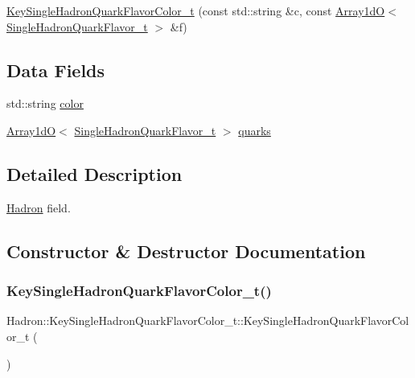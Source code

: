 \begin{DoxyCompactItemize}
\item 
\mbox{\hyperlink{structHadron_1_1KeySingleHadronQuarkFlavorColor__t_aa894166327f6565a8ec49fd863dadf47}{Key\+Single\+Hadron\+Quark\+Flavor\+Color\+\_\+t}} (const std\+::string \&c, const \mbox{\hyperlink{classADAT_1_1Array1dO}{Array1dO}}$<$ \mbox{\hyperlink{structHadron_1_1SingleHadronQuarkFlavor__t}{Single\+Hadron\+Quark\+Flavor\+\_\+t}} $>$ \&f)
\end{DoxyCompactItemize}
\subsection*{Data Fields}
\begin{DoxyCompactItemize}
\item 
std\+::string \mbox{\hyperlink{structHadron_1_1KeySingleHadronQuarkFlavorColor__t_aa5dc10dee689bef8e65d2b9230efdc85}{color}}
\item 
\mbox{\hyperlink{classADAT_1_1Array1dO}{Array1dO}}$<$ \mbox{\hyperlink{structHadron_1_1SingleHadronQuarkFlavor__t}{Single\+Hadron\+Quark\+Flavor\+\_\+t}} $>$ \mbox{\hyperlink{structHadron_1_1KeySingleHadronQuarkFlavorColor__t_ac52e7989b620c4733cc2e960394fd0fd}{quarks}}
\end{DoxyCompactItemize}


\subsection{Detailed Description}
\mbox{\hyperlink{namespaceHadron}{Hadron}} field. 

\subsection{Constructor \& Destructor Documentation}
\mbox{\label{structHadron_1_1KeySingleHadronQuarkFlavorColor__t_acd4b45c7be8c3465db55bcddff1c4617}} 
\subsubsection{\texorpdfstring{KeySingleHadronQuarkFlavorColor\_t()}{KeySingleHadronQuarkFlavorColor\_t()}\hspace{0.1cm}{\footnotesize\ttfamily [1/15]}}
{\footnotesize\ttfamily Hadron\+::\+Key\+Single\+Hadron\+Quark\+Flavor\+Color\+\_\+t\+::\+Key\+Single\+Hadron\+Quark\+Flavor\+Color\+\_\+t (\begin{DoxyParamCaption}{ }\end{DoxyParamCaption})\hspace{0.3cm}{\ttfamily [inline]}}

